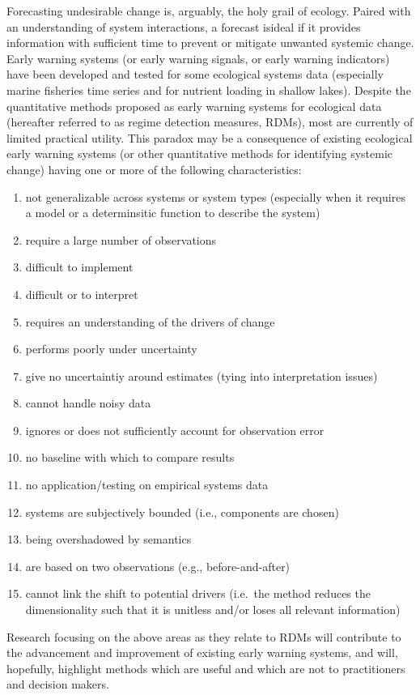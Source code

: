 \documentclass[12pt,twoside,openany]{reedthesis}
\providecommand{\tightlist}{%
  \setlength{\itemsep}{0pt}\setlength{\parskip}{0pt}}
\begin{document}
Forecasting undesirable change is, arguably, the holy grail of ecology.
Paired with an understanding of system interactions, a forecast isideal
if it provides information with sufficient time to prevent or mitigate
unwanted systemic change. Early warning systems (or early warning
signals, or early warning indicators) have been developed and tested for
some ecological systems data (especially marine fisheries time series
and for nutrient loading in shallow lakes). Despite the quantitative
methods proposed as early warning systems for ecological data (hereafter
referred to as regime detection measures, RDMs), most are currently of
limited practical utility. This paradox may be a consequence of existing
ecological early warning systems (or other quantitative methods for
identifying systemic change) having one or more of the following
characteristics:
\begin{enumerate}
\def\labelenumi{\arabic{enumi}.}
\tightlist
\item
  not generalizable across systems or system types (especially when it
  requires a model or a determinsitic function to describe the system)
\item
  require a large number of observations
\item
  difficult to implement
\item
  difficult or to interpret
\item
  requires an understanding of the drivers of change
\item
  performs poorly under uncertainty
\item
  give no uncertaintiy around estimates (tying into interpretation
  issues)
\item
  cannot handle noisy data
\item
  ignores or does not sufficiently account for observation error
\item
  no baseline with which to compare results
\item
  no application/testing on empirical systems data
\item
  systems are subjectively bounded (i.e., components are chosen)
\item
  being overshadowed by semantics
\item
  are based on two observations (e.g., before-and-after)
\item
  cannot link the shift to potential drivers (i.e.~the method reduces
  the dimensionality such that it is unitless and/or loses all relevant
  information)
\end{enumerate}
Research focusing on the above areas as they relate to RDMs will
contribute to the advancement and improvement of existing early warning
systems, and will, hopefully, highlight methods which are useful and
which are not to practitioners and decision makers.
\end{document}
